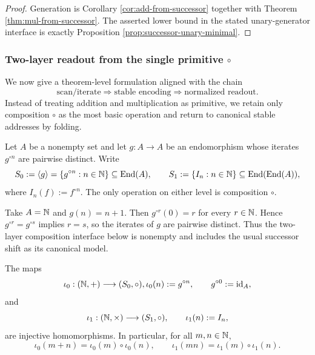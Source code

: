 \begin{proof}
Generation is Corollary \ref{cor:add-from-successor} together with Theorem \ref{thm:mul-from-successor}. The asserted lower bound in the stated unary-generator interface is exactly Proposition \ref{prop:successor-unary-minimal}.
\end{proof}

\subsubsection{Two-layer readout from the single primitive \texorpdfstring{$\circ$}{o}}\label{subsec:arith-composition}
We now give a theorem-level formulation aligned with the chain
\[
\text{scan/iterate}\Longrightarrow \text{stable encoding}\Longrightarrow \text{normalized readout}.
\]
Instead of treating addition and multiplication as primitive, we retain only composition \(\circ\) as the most basic operation and return to canonical stable addresses by folding.

Let \(A\) be a nonempty set and let \(g:A\to A\) be an endomorphism whose iterates \(g^{\circ n}\) are pairwise distinct. Write
\[
S_0:=\langle g\rangle=\{g^{\circ n}:n\in\mathbb{N}\}\subseteq \mathrm{End}(A),
\qquad
S_1:=\{I_n:n\in\mathbb{N}\}\subseteq \mathrm{End}(\mathrm{End}(A)),
\]
where \(I_n(f):=f^{\circ n}\). The only operation on either level is composition \(\circ\).

\begin{example}\label{ex:canonical-shift-distinct-iterates}
Take \(A=\mathbb{N}\) and \(g(n)=n+1\). Then \(g^{\circ r}(0)=r\) for every \(r\in\mathbb{N}\). Hence \(g^{\circ r}=g^{\circ s}\) implies \(r=s\), so the iterates of \(g\) are pairwise distinct. Thus the two-layer composition interface below is nonempty and includes the usual successor shift as its canonical model.
\end{example}

\begin{theorem}\label{thm:composition-two-layer}
The maps
\[
\iota_0:(\mathbb{N},+)\longrightarrow (S_0,\circ),
\iota_0(n):=g^{\circ n},
\qquad
g^{\circ 0}:=\mathrm{id}_A,
\]
and
\[
\iota_1:(\mathbb{N},\times)\longrightarrow (S_1,\circ),
\qquad
\iota_1(n):=I_n,
\]
are injective homomorphisms. In particular, for all \(m,n\in\mathbb{N}\),
\[
\iota_0(m+n)=\iota_0(m)\circ \iota_0(n),
\qquad
\iota_1(mn)=\iota_1(m)\circ \iota_1(n).
\]
\end{theorem}

